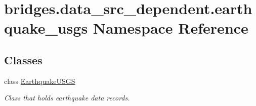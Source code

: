 \hypertarget{namespacebridges_1_1data__src__dependent_1_1earthquake__usgs}{}\section{bridges.\+data\+\_\+src\+\_\+dependent.\+earthquake\+\_\+usgs Namespace Reference}
\label{namespacebridges_1_1data__src__dependent_1_1earthquake__usgs}
\subsection*{Classes}
\begin{DoxyCompactItemize}
\item 
class \hyperlink{classbridges_1_1data__src__dependent_1_1earthquake__usgs_1_1_earthquake_u_s_g_s}{Earthquake\+U\+S\+GS}
\begin{DoxyCompactList}\small\item\em Class that holds earthquake data records. \end{DoxyCompactList}\end{DoxyCompactItemize}
